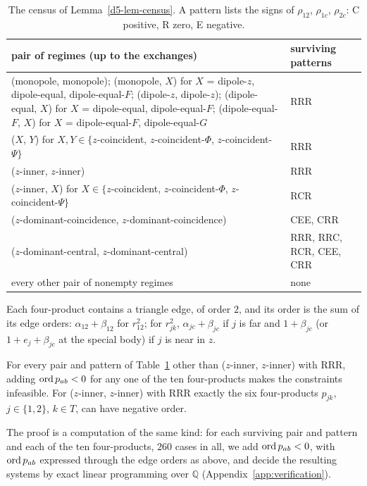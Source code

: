 \begin{table}[ht]
\centering
\small
\begin{tabular}{p{8.9cm}p{3.3cm}}
\hline
pair of regimes (up to the exchanges) & surviving patterns \\
\hline
(monopole, monopole); (monopole, $X$) for $X$ = dipole-$z$, dipole-equal, dipole-equal-$F$;
(dipole-$z$, dipole-$z$); (dipole-equal, $X$) for $X$ = dipole-equal, dipole-equal-$F$;
(dipole-equal-$F$, $X$) for $X$ = dipole-equal-$F$, dipole-equal-$G$ & RRR \\
($X$, $Y$) for $X,Y\in\{z$-coincident, $z$-coincident-$\Phi$, $z$-coincident-$\Psi\}$ & RRR \\
($z$-inner, $z$-inner) & RRR \\
($z$-inner, $X$) for $X\in\{z$-coincident, $z$-coincident-$\Phi$, $z$-coincident-$\Psi\}$ & RCR \\
($z$-dominant-coincidence, $z$-dominant-coincidence) & CEE, CRR \\
($z$-dominant-central, $z$-dominant-central) & RRR, RRC, RCR, CEE, CRR \\
every other pair of nonempty regimes & none \\
\hline
\end{tabular}
\caption{The census of Lemma~\ref{d5-lem-census}.  A pattern lists the signs of $\rho_{12}$,
$\rho_{1c}$, $\rho_{2c}$: C positive, R zero, E negative.}\label{d5-tab-survivors}
\end{table}

Each four-product contains a triangle edge, of order $2$, and its order is the sum of its edge
orders: $\alpha_{12}+\beta_{12}$ for $r_{12}^2$; for $r_{jk}^2$, $\alpha_{jc}+\beta_{jc}$ if $j$ is far
and $1+\beta_{jc}$ (or $1+e_j+\beta_{jc}$ at the special body) if $j$ is near in $z$.

\begin{lemma}\label{d5-lem-four}
For every pair and pattern of Table~\ref{d5-tab-survivors} other than ($z$-inner, $z$-inner) with
RRR, adding $\operatorname{ord} p_{ab}<0$ for any one of the ten four-products makes the constraints infeasible.
For ($z$-inner, $z$-inner) with RRR exactly the six four-products $p_{jk}$, $j\in\{1,2\}$, $k\in T$,
can have negative order.
\end{lemma}
The proof is a computation of the same kind: for each surviving pair and pattern and each of the
ten four-products, $260$ cases in all, we add $\operatorname{ord} p_{ab}<0$, with $\operatorname{ord} p_{ab}$ expressed through
the edge orders as above, and decide the resulting systems by exact linear programming over
$\mathbb Q$ (Appendix~\ref{app:verification}).

